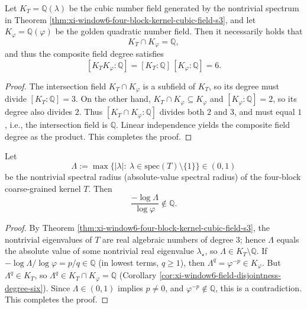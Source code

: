 \begin{corollary}\label{cor:xi-window6-field-disjointness-degree-six}
Let \(K_T=\mathbb Q(\lambda)\) be the cubic number field generated by the nontrivial spectrum in Theorem \ref{thm:xi-window6-four-block-kernel-cubic-field-s3},
and let \(K_\varphi=\mathbb Q(\varphi)\) be the golden quadratic number field.
Then it necessarily holds that
\[
K_T\cap K_\varphi=\mathbb Q,
\]
and thus the composite field degree satisfies
\[
[K_TK_\varphi:\mathbb Q]=[K_T:\mathbb Q]\,[K_\varphi:\mathbb Q]=6.
\]
\end{corollary}

\begin{proof}
The intersection field \(K_T\cap K_\varphi\) is a subfield of \(K_T\), so its degree must divide \([K_T:\mathbb Q]=3\).
On the other hand, \(K_T\cap K_\varphi\subseteq K_\varphi\) and \([K_\varphi:\mathbb Q]=2\), so its degree also divides \(2\).
Thus \([K_T\cap K_\varphi:\mathbb Q]\) divides both \(2\) and \(3\), and must equal \(1\), i.e., the intersection field is \(\mathbb Q\).
Linear independence yields the composite field degree as the product. This completes the proof.
\end{proof}

\begin{corollary}\label{cor:xi-window6-logLambda-logphi-irrational}
Let
\[
\Lambda:=\max\{|\lambda|:\ \lambda\in\mathrm{spec}(T)\setminus\{1\}\}\in(0,1)
\]
be the nontrivial spectral radius (absolute-value spectral radius) of the four-block coarse-grained kernel \(T\).
Then
\[
\frac{-\log\Lambda}{\log\varphi}\notin\mathbb Q.
\]
\end{corollary}

\begin{proof}
By Theorem \ref{thm:xi-window6-four-block-kernel-cubic-field-s3}, the nontrivial eigenvalues of \(T\) are real algebraic numbers of degree \(3\);
hence \(\Lambda\) equals the absolute value of some nontrivial real eigenvalue \(\lambda_\star\), so \(\Lambda\in K_T\setminus\mathbb Q\).
If \(-\log\Lambda/\log\varphi=p/q\in\mathbb Q\) (in lowest terms, \(q\ge 1\)), then
\(
\Lambda^q=\varphi^{-p}\in K_\varphi
\).
But \(\Lambda^q\in K_T\), so \(\Lambda^q\in K_T\cap K_\varphi=\mathbb Q\) (Corollary \ref{cor:xi-window6-field-disjointness-degree-six}).
Since \(\Lambda\in(0,1)\) implies \(p\neq 0\), and \(\varphi^{-p}\notin\mathbb Q\), this is a contradiction. This completes the proof.
\end{proof}

